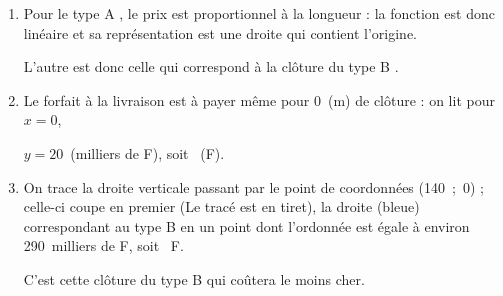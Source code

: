 \begin{enumerate}[resume]
\item %
Pour le \og type A \fg{}, le prix est proportionnel à la longueur : la fonction est donc linéaire et sa représentation est une droite qui contient l'origine.

L'autre est donc celle qui correspond à la clôture du \og type B \fg{}.

\item %
Le forfait à la livraison est à payer même pour $0$~(m) de clôture : on lit pour $x = 0$,

$y = 20$~(milliers de F), soit ~(F).
\item %

On trace la droite verticale passant par le point de coordonnées (140~;~0) ; celle-ci coupe en premier  (Le tracé est en tiret), la droite (bleue) correspondant au \og type B \fg{} en un point dont l'ordonnée est égale à environ 290~milliers de F, soit ~F.

C'est cette clôture du \og type B \fg{} qui coûtera le moins cher.
\end{enumerate}

\medskip

